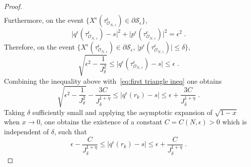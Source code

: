 \documentclass[10pt,a4paper]{amsart}
\begin{document}
\begin{proof}
\begin{align}
\end{align}
Furthermore, on the event $\{X^{\epsilon}(\tau_{\mathcal{O}_{N,\,\epsilon}}^{\epsilon})\in\partial\mathcal{S}_{\epsilon}\}$, 
\begin{equation}\label{eq:equation boundary S}
\big|q^{\epsilon}(\tau_{\mathcal{O}_{N,\,\epsilon}}^{\epsilon})-s\big|^{2}+\big|p^{\epsilon}(\tau_{\mathcal{O}_{N,\,\epsilon}}^{\epsilon})\big|^{2}=\epsilon^2\;.
\end{equation}
Therefore, on the event $\{X^{\epsilon}(\tau_{\mathcal{O}_{N,\,\epsilon}}^{\epsilon})\in\partial\mathcal{S}_{\epsilon},\,\big|p^{\epsilon}(\tau_{\mathcal{O}_{N,\,\epsilon}}^{\epsilon})\big|\leq\delta\}$,
\[
\sqrt{\epsilon^2-\frac{1}{J^2_\delta}}\leq\big|q^{\epsilon}(\tau_{\mathcal{O}_{N,\,\epsilon}}^{\epsilon})-s\big|\leq \epsilon\;.
\]
Combining the inequality above with~\eqref{eq:first triangle ineq} one obtains
\[
\sqrt{\epsilon^2-\frac{1}{J^2_\delta}}-\frac{3C}{J_\delta^{1+\eta}}\leq\big|q^{\epsilon}(r_k)-s\big|\leq \epsilon+\frac{3C}{J_\delta^{1+\eta}}\;.
\]
Taking $\delta$ sufficiently small and applying the asymptotic expansion of $\sqrt{1-x}$ when $x\rightarrow0$, one obtains the existence of a constant $C=C(N,\epsilon)>0$ which is independent of $\delta$, such that
\[
\epsilon-\frac{C}{J_\delta^{1+\eta}}\leq\big|q^{\epsilon}(r_k)-s\big|\leq \epsilon+\frac{C}{J_\delta^{1+\eta}}\;.
\]


\end{proof}
\end{document}
